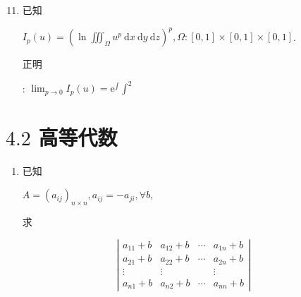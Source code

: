 \documentclass[10pt]{article}
\begin{document}
\begin{enumerate}
  \setcounter{enumi}{10}
  \item \begin{CJK}{UTF8}{mj}已知\end{CJK} $I_{p}(u)=\left(\ln \iiint_{\Omega} u^{p} \mathrm{~d} x \mathrm{~d} y \mathrm{~d} z\right)^{p}, \Omega:[0,1] \times[0,1] \times[0,1]$. \begin{CJK}{UTF8}{mj}正明\end{CJK}: $\lim _{p \rightarrow 0} I_{p}(u)=\mathrm{e}^{\int} \int^{2}$
\end{enumerate}
\section{$4.2$ 高等代数}
\begin{enumerate}
  \item \begin{CJK}{UTF8}{mj}已知\end{CJK} $A=\left(a_{i j}\right)_{n \times n}, a_{i j}=-a_{j i}, \forall b$, \begin{CJK}{UTF8}{mj}求\end{CJK}
\end{enumerate}
$$
\left|\begin{array}{cccc}
a_{11}+b & a_{12}+b & \cdots & a_{1 n}+b \\
a_{21}+b & a_{22}+b & \cdots & a_{2 n}+b \\
\vdots & \vdots & & \vdots \\
a_{n 1}+b & a_{n 2}+b & \cdots & a_{n n}+b
\end{array}\right|
$$
\end{document}
